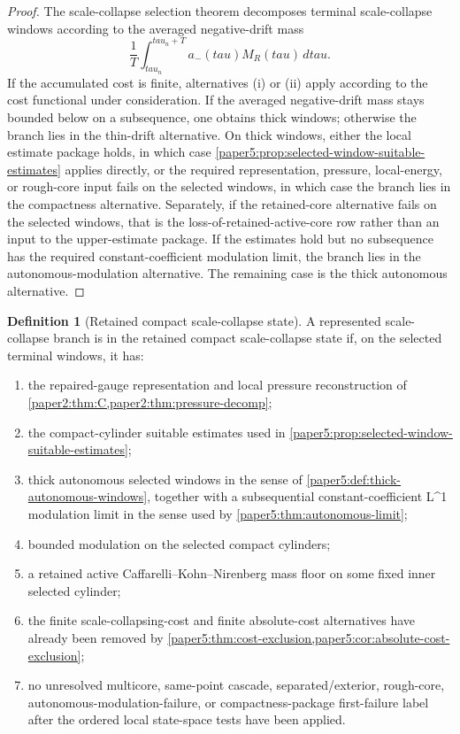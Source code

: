 \documentclass[11pt]{amsart}
\def\({}%
\def\){}%
\def\tau{tau}%
\theoremstyle{plain}
\theoremstyle{definition}
\newtheorem{definition}[definition]{Definition}
\theoremstyle{remark}
\begin{document}
\begin{proof}
The scale-collapse selection theorem decomposes terminal scale-collapse windows according to the
averaged negative-drift mass
\[
  \frac1T\int_{\tau_n}^{\tau_n+T}a_-(\tau)M_R(\tau)\,d\tau.
\]
If the accumulated cost is finite, alternatives (i) or (ii) apply according to the cost
functional under consideration.  If the averaged negative-drift mass stays bounded below on a
subsequence, one obtains thick windows; otherwise the branch lies in the thin-drift alternative.
On thick windows, either the local estimate package holds, in which case
\cref{paper5:prop:selected-window-suitable-estimates} applies directly, or the
required representation, pressure, local-energy, or rough-core input fails on
the selected windows, in which case the branch lies in the compactness
alternative.  Separately, if the retained-core alternative fails on the
selected windows, that is the loss-of-retained-active-core row rather than an
input to the upper-estimate package.  If
the estimates hold but no subsequence has the required constant-coefficient modulation limit,
the branch lies in the autonomous-modulation alternative.  The remaining case is the thick
autonomous alternative.
\end{proof}

\begin{definition}[Retained compact scale-collapse state]
\label{paper5:def:retained-compact-scale-collapse-state}
A represented scale-collapse branch is in the retained compact
scale-collapse state if, on the selected terminal windows, it has:
\begin{enumerate}[label=\textup{(\roman*)}]
\item the repaired-gauge representation and local pressure reconstruction of
\cref{paper2:thm:C,paper2:thm:pressure-decomp};
\item the compact-cylinder suitable estimates used in
\cref{paper5:prop:selected-window-suitable-estimates};
\item thick autonomous selected windows in the sense of
\cref{paper5:def:thick-autonomous-windows}, together with a subsequential
constant-coefficient \(L^1\) modulation limit in the sense used by
\cref{paper5:thm:autonomous-limit};
\item bounded modulation on the selected compact cylinders;
\item a retained active Caffarelli--Kohn--Nirenberg mass floor on some fixed
inner selected cylinder;
\item the finite scale-collapsing-cost and finite absolute-cost alternatives
have already been removed by
\cref{paper5:thm:cost-exclusion,paper5:cor:absolute-cost-exclusion};
\item no unresolved multicore, same-point cascade,
separated/exterior, rough-core, autonomous-modulation-failure, or
compactness-package first-failure label after the ordered local state-space
tests have been applied.
\end{enumerate}
\end{definition}
\end{document}

